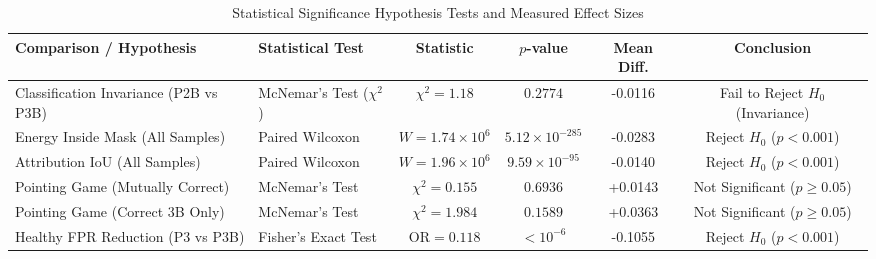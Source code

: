 \begin{table}[t]
\centering
\caption{Statistical Significance Hypothesis Tests and Measured Effect Sizes}
\label{tab:statistical_results}
\small
\setlength{\tabcolsep}{5pt}
\begin{tabular}{llcccc}
\toprule
\textbf{Comparison / Hypothesis} & \textbf{Statistical Test} & \textbf{Statistic} & \textbf{$p$-value} & \textbf{Mean Diff.} & \textbf{Conclusion} \\
\midrule
Classification Invariance (P2B vs P3B) & McNemar's Test ($\chi^2$) & $\chi^2 = 1.18$ & $0.2774$ & -0.0116 & Fail to Reject $H_0$ (Invariance) \\
Energy Inside Mask (All Samples) & Paired Wilcoxon & $W = 1.74 \times 10^6$ & $5.12 \times 10^{-285}$ & -0.0283 & Reject $H_0$ ($p < 0.001$) \\
Attribution IoU (All Samples) & Paired Wilcoxon & $W = 1.96 \times 10^6$ & $9.59 \times 10^{-95}$ & -0.0140 & Reject $H_0$ ($p < 0.001$) \\
Pointing Game (Mutually Correct) & McNemar's Test & $\chi^2 = 0.155$ & $0.6936$ & +0.0143 & Not Significant ($p \ge 0.05$) \\
Pointing Game (Correct 3B Only) & McNemar's Test & $\chi^2 = 1.984$ & $0.1589$ & +0.0363 & Not Significant ($p \ge 0.05$) \\
Healthy FPR Reduction (P3 vs P3B) & Fisher's Exact Test & $\text{OR} = 0.118$ & $< 10^{-6}$ & -0.1055 & Reject $H_0$ ($p < 0.001$) \\
\bottomrule
\end{tabular}
\end{table}


